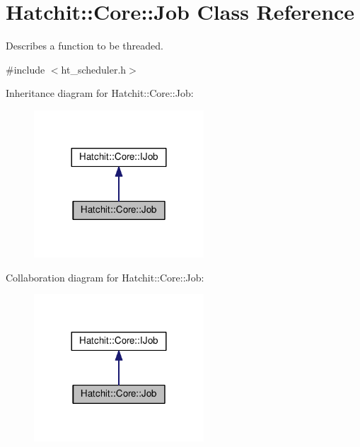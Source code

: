 \hypertarget{classHatchit_1_1Core_1_1Job}{}\section{Hatchit\+:\+:Core\+:\+:Job Class Reference}
\label{classHatchit_1_1Core_1_1Job}


Describes a function to be threaded.  




{\ttfamily \#include $<$ht\+\_\+scheduler.\+h$>$}



Inheritance diagram for Hatchit\+:\+:Core\+:\+:Job\+:
\nopagebreak
\begin{figure}[H]
\begin{center}
\leavevmode
\includegraphics[width=180pt]{classHatchit_1_1Core_1_1Job__inherit__graph}
\end{center}
\end{figure}


Collaboration diagram for Hatchit\+:\+:Core\+:\+:Job\+:
\nopagebreak
\begin{figure}[H]
\begin{center}
\leavevmode
\includegraphics[width=180pt]{classHatchit_1_1Core_1_1Job__coll__graph}
\end{center}
\end{figure}

